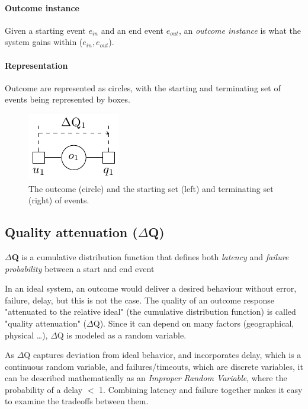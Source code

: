     \paragraph{Outcome instance}
    Given a starting event $e_{in}$ and an end event $e_{out}$, an \textit{outcome instance} is what the system gains within ($e_{in}, e_{out}$). 

    \paragraph{Representation}
    Outcome are represented as circles, with the starting and terminating set of events being represented by boxes.
    \begin{figure}[H]
        \begin{center}
            \includegraphics[scale=1.2]{tikz/outdq.pdf}
        \end{center}
        \caption{The outcome (circle) and the starting set (left) and terminating set (right) of events.}
    \end{figure}

\subsection{Quality attenuation ($\Delta$Q)}
        \textbf{$\Delta$Q} is a cumulative distribution function that defines both \textit{latency} and \textit{failure probability} between a start and end event \cite{dq-tut}

        In an ideal system, an outcome would deliver a desired behaviour without error, failure, delay, but this is not the case. The quality of an outcome response "attenuated to the relative ideal" (the cumulative distribution function) is called "quality attenuation" ($\Delta$Q). Since it can depend on many factors (geographical, physical \dots), $\Delta$Q is modeled as a random variable.

    As $\Delta$Q captures deviation from ideal behavior, and incorporates delay, which is a continuous random variable, and failures/timeouts, which are discrete variables, it can be described mathematically as an \textit{Improper Random Variable}, where the probability of a delay $<$ 1. Combining latency and failure together makes it easy to examine the tradeoffs between them.

